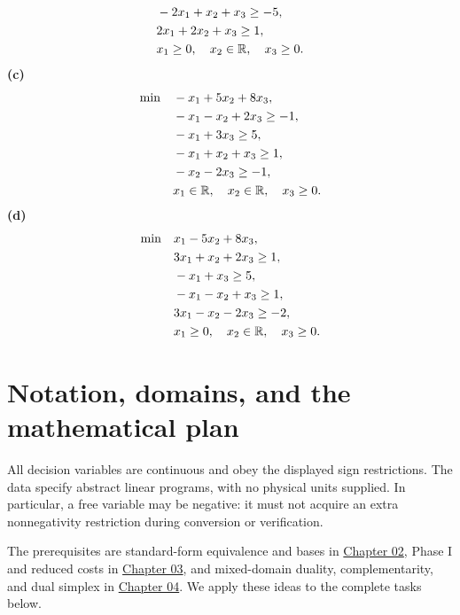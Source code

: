 \documentclass[11pt,a4paper]{article}
\begin{document}
\begin{otherlanguage}{polish}
\[\begin{aligned}
      &-2x_1+x_2+x_3\geq-5,\\
      &2x_1+2x_2+x_3\geq1,\\
      &x_1\geq0,\quad x_2\in\mathbb{R},\quad x_3\geq0.
    \end{aligned}
  \]
  \noindent\textbf{(c)}
  \[
    \begin{aligned}
      \min\quad &-x_1+5x_2+8x_3,\\
      &-x_1-x_2+2x_3\geq-1,\\
      &-x_1+3x_3\geq5,\\
      &-x_1+x_2+x_3\geq1,\\
      &-x_2-2x_3\geq-1,\\
      &x_1\in\mathbb{R},\quad x_2\in\mathbb{R},\quad x_3\geq0.
    \end{aligned}
  \]
  \noindent\textbf{(d)}
  \[
    \begin{aligned}
      \min\quad &x_1-5x_2+8x_3,\\
      &3x_1+x_2+2x_3\geq1,\\
      &-x_1+x_3\geq5,\\
      &-x_1-x_2+x_3\geq1,\\
      &3x_1-x_2-2x_3\geq-2,\\
      &x_1\geq0,\quad x_2\in\mathbb{R},\quad x_3\geq0.
    \end{aligned}
  \]
\end{otherlanguage}

\section{Notation, domains, and the mathematical plan}\label{sec:conventions}
All decision variables are continuous and obey the displayed sign restrictions.
The data specify abstract linear programs, with no physical units supplied.
In particular, a free variable may be negative: it must not acquire an extra
nonnegativity restriction during conversion or verification.

The prerequisites are standard-form equivalence and bases in
\href{../lectures/02-linear-programming.pdf}{Chapter 02}, Phase I and reduced costs in
\href{../lectures/03-simplex-method.pdf}{Chapter 03}, and mixed-domain duality,
complementarity, and dual simplex in
\href{../lectures/04-degeneracy-and-duality.pdf}{Chapter 04}.
We apply these ideas to the complete tasks below.
\end{document}

